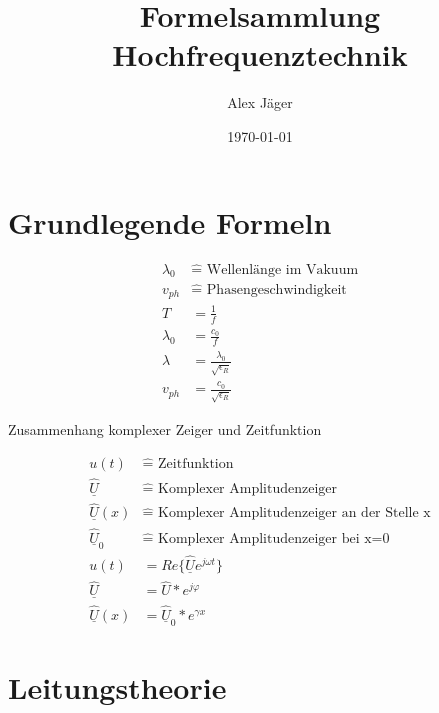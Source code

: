 \documentclass[11pt]{scrartcl}
\author{Alex Jäger}
\title{Formelsammlung Hochfrequenztechnik}
\date{\today}
\def\Uc{\underline{\hat U}}
\begin{document}
\maketitle
\newpage
\section{Grundlegende Formeln}
\begin{align*}
	\lambda_0 & \hat{=}\text{ Wellenlänge im Vakuum} \\
	v_{ph} & \hat{=}\text{ Phasengeschwindigkeit} \\
	T&=\frac{1}{f} \\
	\lambda _0&=\frac{c_0}{f} \\
	\lambda&=\frac{\lambda_0}{\sqrt{\epsilon_R}} \\
	v_{ph}&=\frac{c_0}{\sqrt{\epsilon_R}}
\end{align*}
\begin{center}
	Zusammenhang komplexer Zeiger und Zeitfunktion
\end{center}
\begin{align*}
	u(t) & \hat{=} \text{ Zeitfunktion} \\
	\Uc & \hat{=} \text{ Komplexer Amplitudenzeiger} \\
	\Uc(x) & \hat{=} \text{ Komplexer Amplitudenzeiger an der Stelle x} \\
	\Uc_0 & \hat{=} \text{ Komplexer Amplitudenzeiger bei x=0} \\
	u(t)&=Re\{\Uc e^{j\omega t}\} \\
	\Uc &=\hat U*e^{j\varphi} \\
	\Uc(x)&=\Uc_0*e^{\gamma x}
\end{align*}

\section{Leitungstheorie}
\end{document}

